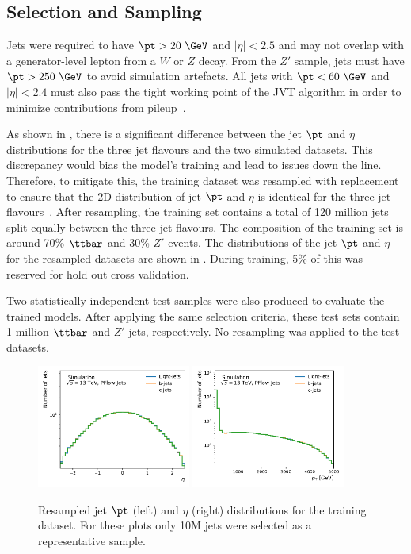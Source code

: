 \subsection{Selection and Sampling}

Jets were required to have $\pt > 20~\GeV$ and $|\eta| < 2.5$ and may not overlap with a generator-level lepton from a $W$ or $Z$ decay.
From the $Z'$ sample, jets must have $\pt > 250~\GeV$ to avoid simulation artefacts.
All jets with $\pt < 60~\GeV$ and $|\eta| < 2.4$ must also pass the tight working point of the JVT algorithm in order to minimize contributions from pileup~\cite{JVT}.

As shown in , there is a significant difference between the jet $\pt$ and $\eta$ distributions for the three jet flavours and the two simulated datasets.
This discrepancy would bias the model's training and lead to issues down the line.
Therefore, to mitigate this, the training dataset was resampled with replacement to ensure that the 2D distribution of jet $\pt$ and $\eta$ is identical for the three jet flavours~\cite{AlexThesis}.
After resampling, the training set contains a total of 120 million jets split equally between the three jet flavours.
The composition of the training set is around 70\% $\ttbar$ and 30\% $Z'$ events.
The distributions of the jet $\pt$ and $\eta$ for the resampled datasets are shown in .
During training, 5\% of this was reserved for hold out cross validation.

Two statistically independent test samples were also produced to evaluate the trained models.
After applying the same selection criteria, these test sets contain 1 million $\ttbar$ and $Z'$ jets, respectively.
No resampling was applied to the test datasets.

\begin{figure}
    \centering
    \includegraphics[width=0.45\textwidth]{figures/flavour_tagging/train_0.pdf}
    \includegraphics[width=0.45\textwidth]{figures/flavour_tagging/train_1.pdf}
    \caption{Resampled jet $\pt$ (left) and $\eta$ (right) distributions for the training dataset. For these plots only 10M jets were selected as a representative sample.}
    \label{fig:train_jet_pt_eta}
\end{figure}

